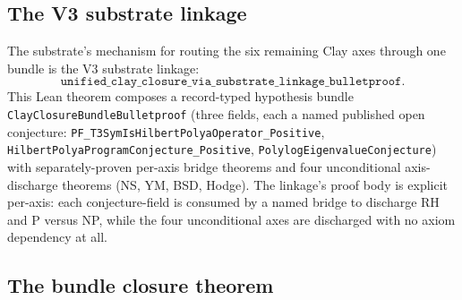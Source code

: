 \documentclass[11pt,a4paper]{amsart}
\theoremstyle{plain}
\theoremstyle{definition}
\begin{document}
\subsection{The V3 substrate linkage}

The substrate's mechanism for routing the six remaining Clay axes through one bundle is the V3 substrate linkage:
\[
\texttt{unified\_clay\_closure\_via\_substrate\_linkage\_bulletproof}.
\]
This Lean theorem composes a record-typed hypothesis bundle \texttt{ClayClosureBundleBulletproof} (three fields, each a named published open conjecture: \texttt{PF\_T3SymIsHilbertPolyaOperator\_Positive}, \texttt{HilbertPolyaProgramConjecture\_Positive}, \texttt{PolylogEigenvalueConjecture}) with separately-proven per-axis bridge theorems and four unconditional axis-discharge theorems (NS, YM, BSD, Hodge). The linkage's proof body is explicit per-axis: each conjecture-field is consumed by a named bridge to discharge RH and P versus NP, while the four unconditional axes are discharged with no axiom dependency at all.

\subsection{The bundle closure theorem}
\end{document}
